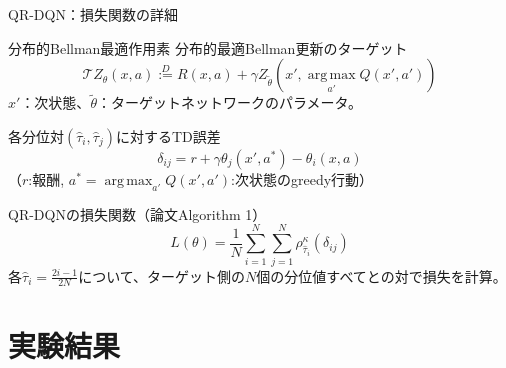 \documentclass[aspectratio=169, dvipdfmx, 11pt]{beamer}
\begin{document}
\begin{frame}{QR-DQN：損失関数の詳細}
  \begin{block}{分布的Bellman最適作用素}
    {\scriptsize 分布的最適Bellman更新のターゲット}
    {\scriptsize
    \vspace{-4pt}
    \[
      \mathcal{T} Z_\theta(x,a) \overset{D}{:=} R(x,a) + \gamma Z_{\tilde{\theta}}\!\left(x', \operatorname*{arg\,max}_{a'} Q(x', a')\right)
    \]
    \vspace{-4pt}
    }
    {\tiny $x'$：次状態、$\tilde{\theta}$：ターゲットネットワークのパラメータ。}
  \end{block}
  {\scriptsize 各分位対$(\hat{\tau}_i, \hat{\tau}_j)$に対するTD誤差}
  {\scriptsize
  \vspace{-4pt}
  \[ \delta_{ij} = r + \gamma \theta_j(x', a^*) - \theta_i(x, a) \]
  \vspace{-4pt}
  }
  {\tiny （$r$:報酬, $a^* = \operatorname*{arg\,max}_{a'} Q(x', a')$:次状態のgreedy行動）}
  \begin{exampleblock}{QR-DQNの損失関数（論文Algorithm 1）}
    {\scriptsize
    \vspace{-4pt}
    \[
      L(\theta) = \frac{1}{N} \sum_{i=1}^{N} \sum_{j=1}^{N} \rho_{\hat{\tau}_i}^\kappa(\delta_{ij})
    \]
    \vspace{-4pt}
    }
    {\tiny 各$\hat{\tau}_i = \frac{2i-1}{2N}$について、ターゲット側の$N$個の分位値すべてとの対で損失を計算。}
  \end{exampleblock}
\end{frame}

\section{実験結果}
\end{document}
